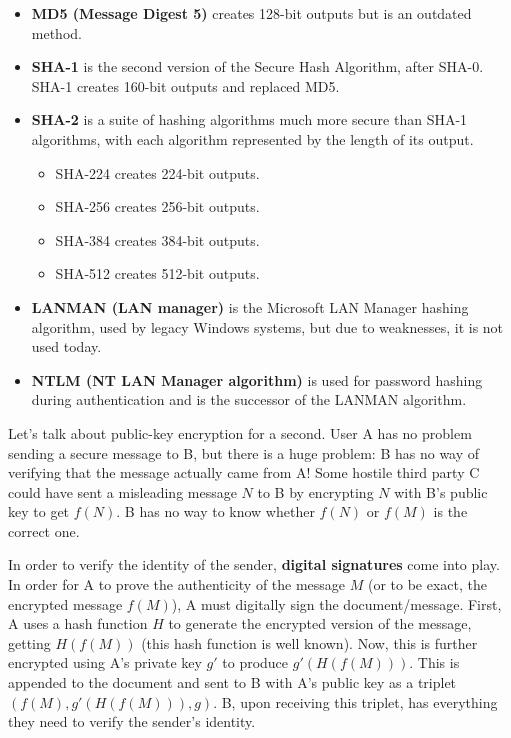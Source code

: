 \documentclass{article}
\newcounter{algo}[section]
\begin{document}
\begin{enumerate}
      \begin{itemize}
        \item \textbf{MD5 (Message Digest 5)} creates 128-bit outputs but is an outdated method.
        \item \textbf{SHA-1} is the second version of the Secure Hash Algorithm, after SHA-0. SHA-1 creates 160-bit outputs and replaced MD5.
        \item \textbf{SHA-2} is a suite of hashing algorithms much more secure than SHA-1 algorithms, with each algorithm represented by the length of its output.
        \begin{itemize}
          \item SHA-224 creates 224-bit outputs.
          \item SHA-256 creates 256-bit outputs.
          \item SHA-384 creates 384-bit outputs.
          \item SHA-512 creates 512-bit outputs.
        \end{itemize}
        \item \textbf{LANMAN (LAN manager)} is the Microsoft LAN Manager hashing algorithm, used by legacy Windows systems, but due to weaknesses, it is not used today.
        \item \textbf{NTLM (NT LAN Manager algorithm)} is used for password hashing during authentication and is the successor of the LANMAN algorithm.
      \end{itemize}
    \end{enumerate}

    Let's talk about public-key encryption for a second. User A has no problem sending a secure message to B, but there is a huge problem: B has no way of verifying that the message actually came from A! Some hostile third party C could have sent a misleading message $N$ to B by encrypting $N$ with B's public key to get $f(N)$. B has no way to know whether $f(N)$ or $f(M)$ is the correct one.

    In order to verify the identity of the sender, \textbf{digital signatures} come into play. In order for A to prove the authenticity of the message $M$ (or to be exact, the encrypted message $f(M)$), A must digitally sign the document/message. First, A uses a hash function $H$ to generate the encrypted version of the message, getting $H(f(M))$ (this hash function is well known). Now, this is further encrypted using A's private key $g'$ to produce $g'(H(f(M)))$. This is appended to the document and sent to B with A's public key as a triplet $(f(M), g'(H(f(M))), g)$. B, upon receiving this triplet, has everything they need to verify the sender's identity.
\end{document}
